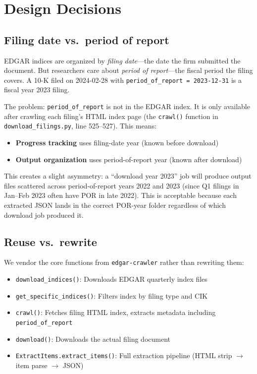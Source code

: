\documentclass[11pt]{article}
\begin{document}
\section{Design Decisions}

\subsection{Filing date vs.\ period of report}

EDGAR indices are organized by \emph{filing date}---the date the firm submitted the document. But researchers care about \emph{period of report}---the fiscal period the filing covers. A 10-K filed on 2024-02-28 with \texttt{period\_of\_report = 2023-12-31} is a fiscal year 2023 filing.

The problem: \texttt{period\_of\_report} is not in the EDGAR index. It is only available after crawling each filing's HTML index page (the \texttt{crawl()} function in \texttt{download\_filings.py}, line 525--527). This means:

\begin{itemize}
  \item \textbf{Progress tracking} uses filing-date year (known before download)
  \item \textbf{Output organization} uses period-of-report year (known after download)
\end{itemize}

This creates a slight asymmetry: a ``download year 2023'' job will produce output files scattered across period-of-report years 2022 and 2023 (since Q1 filings in Jan--Feb 2023 often have POR in late 2022). This is acceptable because each extracted JSON lands in the correct POR-year folder regardless of which download job produced it.

\subsection{Reuse vs.\ rewrite}

We vendor the core functions from \texttt{edgar-crawler} rather than rewriting them:

\begin{itemize}
  \item \texttt{download\_indices()}: Downloads EDGAR quarterly index files
  \item \texttt{get\_specific\_indices()}: Filters index by filing type and CIK
  \item \texttt{crawl()}: Fetches filing HTML index, extracts metadata including \texttt{period\_of\_report}
  \item \texttt{download()}: Downloads the actual filing document
  \item \texttt{ExtractItems.extract\_items()}: Full extraction pipeline (HTML strip $\to$ item parse $\to$ JSON)
\end{itemize}
\end{document}
